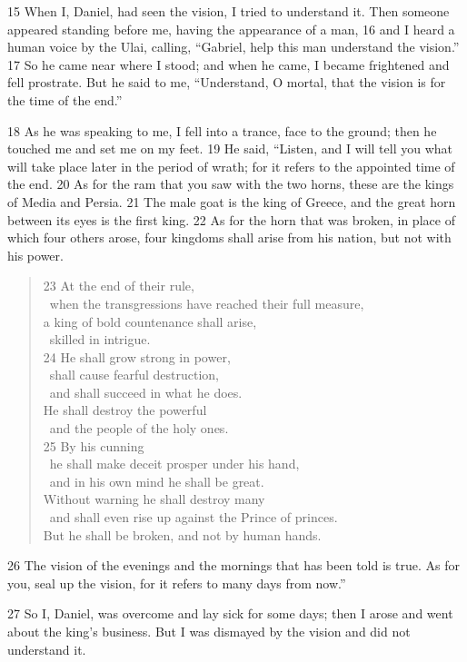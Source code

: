 15 When I, Daniel, had seen the vision, I tried to understand it. Then someone 
appeared standing before me, having the appearance of a man, 16 and I heard a 
human voice by the Ulai, calling, ``Gabriel, help this man understand the 
vision.'' 17 So he came near where I stood; and when he came, I became 
frightened and fell prostrate. But he said to me, ``Understand, O mortal, that 
the vision is for the time of the end.''

18 As he was speaking to me, I fell into a trance, face to the ground; then he 
touched me and set me on my feet. 19 He said, ``Listen, and I will tell you 
what will take place later in the period of wrath; for it refers to the 
appointed time of the end. 20 As for the ram that you saw with the two horns, 
these are the kings of Media and Persia. 21 The male goat is the king of Greece,
and the great horn between its eyes is the first king. 22 As for the horn that 
was broken, in place of which four others arose, four kingdoms shall arise from 
his nation, but not with his power.

\begin{verse}
23 At the end of their rule, \\
\vgap~when the transgressions have reached their full measure, \\
a king of bold countenance shall arise, \\
\vgap~skilled in intrigue. \\
24 He shall grow strong in power, \\
\vgap~shall cause fearful destruction, \\
\vgap~and shall succeed in what he does. \\
He shall destroy the powerful \\
\vgap~and the people of the holy ones. \\
25 By his cunning \\
\vgap~he shall make deceit prosper under his hand, \\
\vgap~and in his own mind he shall be great. \\
Without warning he shall destroy many \\
\vgap~and shall even rise up against the Prince of princes. \\
But he shall be broken, and not by human hands. \\
\end{verse}

26 The vision of the evenings and the mornings that has been told is true. As 
for you, seal up the vision, for it refers to many days from now.''

27 So I, Daniel, was overcome and lay sick for some days; then I arose and went 
about the king's business. But I was dismayed by the vision and did not 
understand it.
